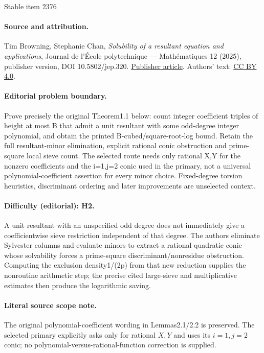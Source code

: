 \documentclass[11pt]{article}
\numberwithin{equation}{section}
\begin{document}
\begin{center}{\Large Stable item 2376}\end{center}
\paragraph{Source and attribution.}
Tim Browning, Stephanie Chan, \emph{Solubility of a resultant equation and applications}, Journal de l’École polytechnique — Mathématiques 12 (2025), publisher version, DOI 10.5802/jep.320. \href{https://jep.centre-mersenne.org/articles/10.5802/jep.320/}{Publisher article}. Authors' text: \href{https://creativecommons.org/licenses/by/4.0/}{CC BY 4.0}.
\paragraph{Editorial problem boundary.}
Prove precisely the original Theorem1.1 below: count integer coefficient triples of height at most B that admit a unit resultant with some odd-degree integer polynomial, and obtain the printed B-cubed/square-root-log bound. Retain the full resultant-minor elimination, explicit rational conic obstruction and prime-square local sieve count. The selected route needs only rational X,Y for the nonzero coefficients and the i=1,j=2 conic used in the primary, not a universal polynomial-coefficient assertion for every minor choice. Fixed-degree torsion heuristics, discriminant ordering and later improvements are unselected context.
\paragraph{Difficulty (editorial): H2.}
A unit resultant with an unspecified odd degree does not immediately give a coefficientwise sieve restriction independent of that degree. The authors eliminate Sylvester columns and evaluate minors to extract a rational quadratic conic whose solvability forces a prime-square discriminant/nonresidue obstruction. Computing the exclusion density1/(2p) from that new reduction supplies the nonroutine arithmetic step; the precise cited large-sieve and multiplicative estimates then produce the logarithmic saving.
\paragraph{Literal source scope note.}
The original polynomial-coefficient wording in Lemmas2.1/2.2 is preserved. The selected primary explicitly asks only for rational $X,Y$ and uses its $i=1,j=2$ conic; no polynomial-versus-rational-function correction is supplied.
\end{document}
